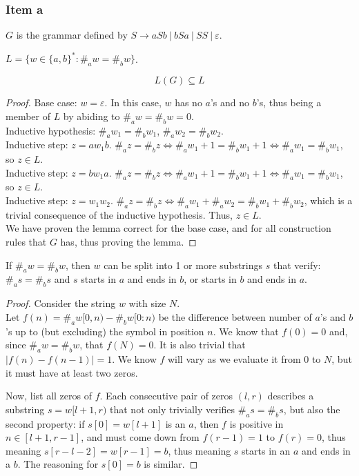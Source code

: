 {\subsubsection{Item a}
\begin{definition}
$G$ is the grammar defined by $S \rightarrow aSb~|~bSa~|~SS~|~\varepsilon$.
\end{definition}
\begin{definition}
$L=\{w \in \{a,b\}^*\colon \#_aw=\#_bw\}$.
\end{definition}
\begin{lemma} \label{lem:AimpB}
\begin{equation*}
	L(G) \subseteq L
\end{equation*}
\end{lemma}
\begin{proof}
Base case: $w=\varepsilon$. In this case, $w$ has no $a$'s and no $b$'s, thus being a member of $L$ by abiding to $\#_aw=\#_bw=0$.\\
Inductive hypothesis: $\#_aw_1=\#_bw_1$, $\#_aw_2=\#_bw_2$.\\
Inductive step: $z=aw_1b$. $\#_az=\#_bz \iff \#_aw_1+1=\#_bw_1+1 \iff \#_aw_1=\#_bw_1$, so $z \in L$.\\
Inductive step: $z=bw_1a$. $\#_az=\#_bz \iff \#_aw_1+1=\#_bw_1+1 \iff \#_aw_1=\#_bw_1$, so $z \in L$.\\
Inductive step: $z=w_1w_2$. $\#_az=\#_bz \iff \#_aw_1+\#_aw_2=\#_bw_1+\#_bw_2$, which is a trivial consequence of the inductive hypothesis. Thus, $z \in L$.\\
We have proven the lemma correct for the base case, and for all construction rules that $G$ has, thus proving the lemma.
\end{proof}
\begin{lemma} \label{lem:simplemma}
If $\#_aw=\#_bw$, then $w$ can be split into 1 or more substrings $s$ that verify: $\#_as=\#_bs$ and $s$ starts in $a$ and ends in $b$, or starts in $b$ and ends in $a$.
\end{lemma}
\begin{proof}
Consider the string $w$ with size $N$.\\
Let $f(n)=\#_aw[0,n)-\#_bw[0:n)$ be the difference between number of $a$'s and $b$'s up to (but excluding) the symbol in position $n$. We know that $f(0)=0$ and, since $\#_aw=\#_bw$, that $f(N)=0$. It is also trivial that $|f(n)-f(n-1)| = 1$. We know $f$ will vary as we evaluate it from $0$ to $N$, but it must have at least two zeros.\par
Now, list all zeros of $f$. Each consecutive pair of zeros $(l,r)$ describes a substring $s=w[l+1,r)$ that not only trivially verifies $\#_as=\#_bs$, but also the second property: if $s[0] = w[l+1]$ is an $a$, then $f$ is positive in $n \in [l+1,r-1]$, and must come down from $f(r-1)=1$ to $f(r)=0$, thus meaning $s[r-l-2]=w[r-1]=b$, thus meaning $s$ starts in an $a$ and ends in a $b$. The reasoning for $s[0]=b$ is similar.

\end{proof}}
